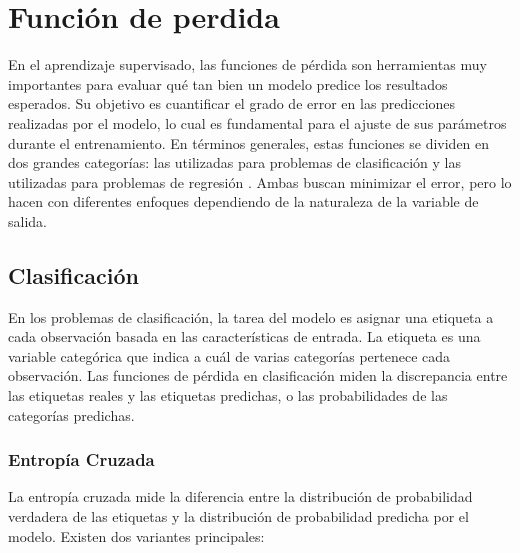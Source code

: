 \section{Función de perdida}

En el aprendizaje supervisado, las funciones de pérdida son herramientas muy importantes para evaluar qué tan bien un modelo predice los resultados esperados. Su objetivo es cuantificar el grado de error en las predicciones realizadas por el modelo, lo cual es fundamental para el ajuste de sus parámetros durante el entrenamiento. En términos generales, estas funciones se dividen en dos grandes categorías: las utilizadas para problemas de clasificación y las utilizadas para problemas de regresión \citep{pajares2021aprendizaje}. Ambas buscan minimizar el error, pero lo hacen con diferentes enfoques dependiendo de la naturaleza de la variable de salida.

\subsection{Clasificación}

En los problemas de clasificación, la tarea del modelo es asignar una etiqueta a cada observación basada en las características de entrada. La etiqueta es una variable categórica que indica a cuál de varias categorías pertenece cada observación. Las funciones de pérdida en clasificación miden la discrepancia entre las etiquetas reales y las etiquetas predichas, o las probabilidades de las categorías predichas.

\subsubsection{Entropía Cruzada}

La entropía cruzada mide la diferencia entre la distribución de probabilidad verdadera de las etiquetas y la distribución de probabilidad predicha por el modelo. Existen dos variantes principales:

